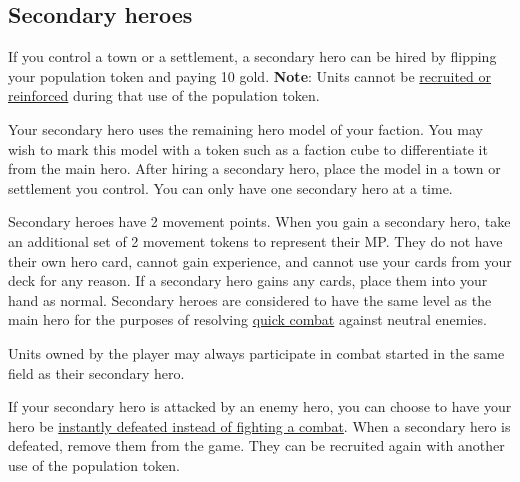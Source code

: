 \documentclass[12pt]{article}
\begin{document}
\subsection*{\hypertarget{Secondary}{Secondary heroes}}
If you control a town or a settlement, a secondary hero can be hired by flipping your population token and paying 10 gold. \textbf{Note}: Units cannot be \hyperlink{Units}{recruited or reinforced} during that use of the population token.\par
Your secondary hero uses the remaining hero model of your faction. You may wish to mark this model with a token such as a faction cube to differentiate it from the main hero. After hiring a secondary hero, place the model in a town or settlement you control. You can only have one secondary hero at a time.\par
Secondary heroes have 2 movement points. When you gain a secondary hero, take an additional set of 2 movement tokens to represent their MP. They do not have their own hero card, cannot gain experience, and cannot use your cards from your deck for any reason. If a secondary hero gains any cards, place them into your hand as normal.
Secondary heroes are considered to have the same level as the main hero for the purposes of resolving \hyperlink{Quick}{quick combat} against neutral enemies.\par
Units owned by the player may always participate in combat started in the same field as their secondary hero.\par
If your secondary hero is attacked by an enemy hero, you can choose to have your hero be \hyperlink{Endcombat}{instantly defeated instead of fighting a combat}. When a secondary hero is defeated, remove them from the game. They can be recruited again with another use of the population token.\par

\clearpage
\end{document}
